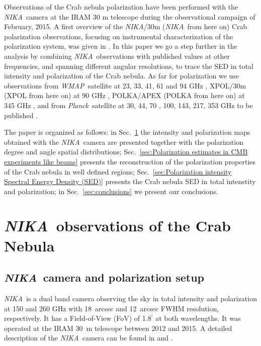 \documentclass[twocolumn,traditabstract]{aa}
\def\NIKA{\textit{NIKA}}
\def\Planck{\textit{Planck}}
\def\WMAP{\textit{WMAP}}
\begin{document}
Observations of the Crab nebula polarization have been performed with the
\NIKA\ camera \citep{monfardini2010,catalano2014,monfardini2014} at the IRAM 30
m telescope during the observational campaign of February, 2015. A first
overview of the \NIKA/30m (\NIKA\ from here on) Crab polarization observations,
focusing on instrumental characterization of the polarization system, was given in
\cite{2016JLTP..184..724R}. In this paper we go a step further in the analysis
by combining \NIKA\ observations with published values at other frequencies, and spanning different angular resolutions, to trace the
SED in total intensity and polarization of the Crab nebula. As far for polarization we use observations from \WMAP\
satellite at 23, 33, 41, 61 and 94 GHz \citep{2011ApJS..192...19W}, XPOL/30m (XPOL from here on) at 90 GHz
\citep{aumont2010}, POLKA/APEX (POLKA from here on) at 345 GHz \citep{2014PASP..126.1027W}, and from
\Planck\ satellite at 30, 44, 70 \citep{2015arXiv150702058P}, 100, 143, 217, 353 GHz to be published \citep{planck2018}.

The paper is organized as follows: in Sec.~\ref{sec:NIKA observations} the
intensity and polarization maps obtained with the \NIKA\ camera are presented
together with the polarization degree and angle spatial distributions;
Sec.~\ref{sec:Polarization estimates in CMB experiments like beams} presents the
reconstruction of the polarization properties of the Crab nebula in well defined
regions; Sec.~\ref{sec:Polarization intensity Spectral Energy Density (SED)}
presents the Crab nebula SED in total intenstity and polarization; in
Sec.~\ref{sec:conclusions} we present our conclusions.
 
\section{\NIKA\ observations of the Crab Nebula}\label{sec:NIKA observations}
\subsection{\NIKA\ camera and polarization setup}\label{sec:nika camera}
\NIKA\ is a dual band camera observing the sky in total intensity and polarization at
150 and 260 GHz with 18~arcsec and 12~arcsec FWHM resolution, respectively. It
has a Field-of-View (FoV) of 1.8$^{\prime}$ at both wavelengths. It was operated at the
IRAM 30~m telescope between 2012 and 2015. A detailed description of the
\NIKA\ camera can be found in \citet{monfardini2010, monfardini2011} and
\citet{catalano2014}.
\end{document}
